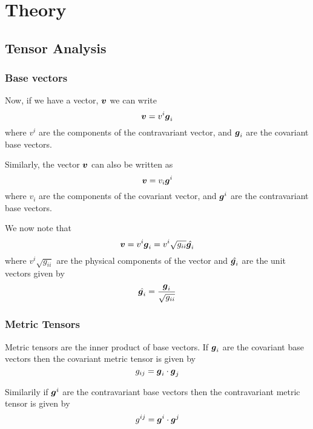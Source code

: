 \clearemptydoublepage
\chapter{Theory}
\label{cha:theory}

\section{Tensor Analysis}
\subsection{Base vectors}

Now, if we have a vector, $\boldsymbol{v}$ we can write
\begin{equation}
  \boldsymbol{v}=v^{i}\boldsymbol{g}_{i}
\end{equation}
where $v^{i}$ are the components of the contravariant vector, and
$\boldsymbol{g}_{i}$ are the covariant base vectors.

Similarly, the vector $\boldsymbol{v}$ can also be written as 
\begin{equation}
  \boldsymbol{v}=v_{i}\boldsymbol{g}^{i}
\end{equation}
where $v_{i}$ are the components of the covariant vector, and
$\boldsymbol{g}^{i}$ are the contravariant base vectors. 

We now note that
\begin{equation}
  \boldsymbol{v}=v^{i}\boldsymbol{g}_{i}=v^{i}\sqrt{g_{ii}}\hat{\boldsymbol{g}_{i}}
\end{equation}
where $v^{i}\sqrt{g_{ii}}$ are the physical components of the vector and
$\hat{\boldsymbol{g}_{i}}$ are the unit vectors given by
\begin{equation}
  \hat{\boldsymbol{g}_{i}}=\dfrac{\boldsymbol{g}_{i}}{\sqrt{g_{ii}}}
\end{equation}

\subsection{Metric Tensors}
\label{sec:metric tensors}

Metric tensors are the inner product of base vectors. If $\boldsymbol{g}_{i}$ are the
covariant base vectors then the covariant metric tensor is given by
\begin{equation}
  g_{ij}=\boldsymbol{g}_{i}\cdot\boldsymbol{g}_{j}
\end{equation}

Similarily if $\boldsymbol{g}^{i}$ are the contravariant base vectors then the
contravariant metric tensor is given by 
\begin{equation}
  g^{ij}=\boldsymbol{g}^{i}\cdot\boldsymbol{g}^{j}
\end{equation}

